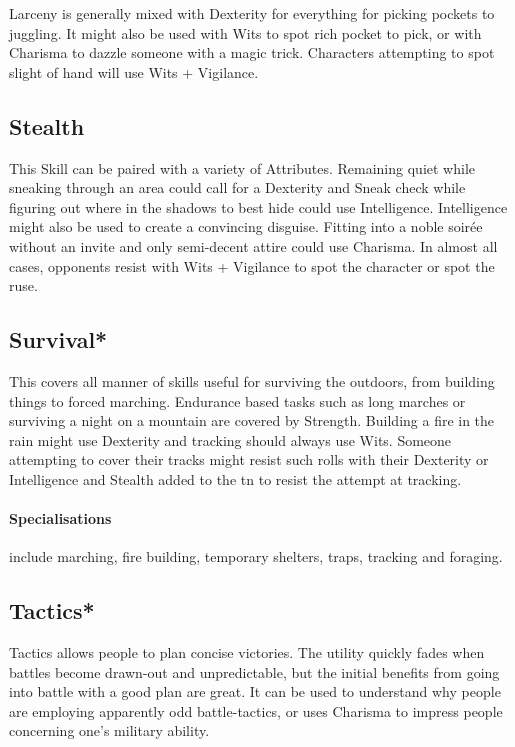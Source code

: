 \documentclass[titlepage,a4paper,openany]{book}
\begin{document}
\begin{multicols}{2}
Larceny is generally mixed with Dexterity for everything for picking pockets to juggling.
It might also be used with Wits to spot rich pocket to pick, or with Charisma to dazzle someone with a magic trick.
Characters attempting to spot slight of hand will use Wits + Vigilance.

\subsection{Stealth}

This Skill can be paired with a variety of Attributes.
Remaining quiet while sneaking through an area could call for a Dexterity and Sneak check while figuring out where in the shadows to best hide could use Intelligence.
Intelligence might also be used to create a convincing disguise.
Fitting into a noble soir\'{e}e without an invite and only semi-decent attire could use Charisma.
In almost all cases, opponents resist with Wits + Vigilance to spot the character or spot the ruse.

\subsection{Survival*}

This covers all manner of skills useful for surviving the outdoors, from building things to forced marching. Endurance based tasks such as long marches or surviving a night on a mountain are covered by Strength. Building a fire in the rain might use Dexterity and tracking should always use Wits. Someone attempting to cover their tracks might resist such rolls with their Dexterity or Intelligence and Stealth added to the \gls{tn} to resist the attempt at tracking.

\paragraph{Specialisations} include marching, fire building, temporary shelters, traps, tracking and foraging.

\subsection{Tactics*}

Tactics allows people to plan concise victories.
The utility quickly fades when battles become drawn-out and unpredictable, but the initial benefits from going into battle with a good plan are great.
It can be used to understand why people are employing apparently odd battle-tactics, or uses Charisma to impress people concerning one's military ability.


\end{multicols}
\end{document}

